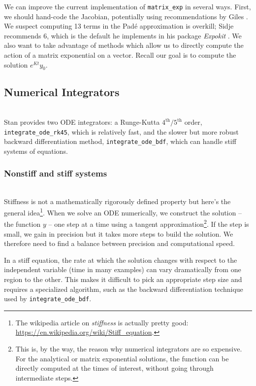 \documentclass[11pt]{amsart}
\begin{document}
We can improve the current implementation of \texttt{matrix\_exp} in several ways. First, we should
hand-code the Jacobian, potentially using recommendations by Giles \cite{Giles:2008}. We suspect 
computing 13 terms in the Pad\'e approximation is overkill; Sidje recommends 6, which is the default 
he implements in his package \textit{Expokit} \cite{Sidje:1998}. We also want to take advantage of methods which 
allow us to directly compute the action of a matrix exponential on a vector. Recall our goal is to 
compute the solution $e^{Kt}y_0$.

\subsection{Numerical Integrators} \ \\

Stan provides two ODE integrators: a Runge-Kutta $4^\mathrm{th}/5^\mathrm{th}$ order, 
\texttt{integrate\_ode\_rk45}, which is relatively fast, and the slower but more robust backward
differentiation method,  \texttt{integrate\_ode\_bdf}, which can handle stiff systems of equations.

\subsubsection{Nonstiff and stiff systems} \ \\

Stiffness is not a mathematically rigorously defined property but here's the general 
idea\footnote{The wikipedia article on \textit{stiffness} is actually pretty good: 
\url{https://en.wikipedia.org/wiki/Stiff_equation}.}. When we solve an ODE numerically, we construct 
the solution -- the function $y$ -- one step at a time using a tangent approximation\footnote{This is, 
by the way, the reason why numerical integrators are so expensive. For the analytical or matrix 
exponential solutions, the function can be directly computed at the times of interest, without going 
through intermediate steps.}. If the step is small, we gain in precision but it takes more steps to build 
the solution. We therefore need to find a balance between precision and computational speed.

In a stiff equation, the rate at which the solution changes with respect to the independent variable 
(time in many examples) can vary dramatically from one region to the other. This makes it difficult 
to pick an appropriate step size and requires a specialized algorithm, such as the backward 
differentiation technique used by \texttt{integrate\_ode\_bdf}.
\end{document}
